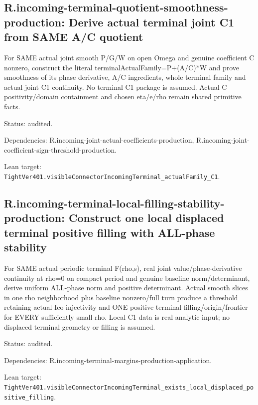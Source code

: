 \documentclass{article}
\begin{document}
\subsection*{R.incoming-terminal-quotient-smoothness-production: Derive actual terminal joint C1 from SAME A/C quotient}
For SAME actual joint smooth P/G/W on open Omega and genuine coefficient C nonzero, construct the literal terminalActualFamily=P+(A/C)*W and prove smoothness of its phase derivative, A/C ingredients, whole terminal family and actual joint C1 continuity. No terminal C1 package is assumed. Actual C positivity/domain containment and chosen eta/e/rho remain shared primitive facts.
\par Status: audited.
\par Dependencies: R.incoming-joint-actual-coefficients-production, R.incoming-joint-coefficient-sign-threshold-production.
\par Lean target: \texttt{TightVer401.visibleConnectorIncomingTerminal\_actualFamily\_C1}.
\subsection*{R.incoming-terminal-local-filling-stability-production: Construct one local displaced terminal positive filling with ALL-phase stability}
For SAME actual periodic terminal F(rho,s), real joint value/phase-derivative continuity at rho=0 on compact period and genuine baseline norm/determinant, derive uniform ALL-phase norm and positive determinant. Actual smooth slices in one rho neighborhood plus baseline nonzero/full turn produce a threshold retaining actual Ico injectivity and ONE positive terminal filling/origin/frontier for EVERY sufficiently small rho. Local C1 data is real analytic input; no displaced terminal geometry or filling is assumed.
\par Status: audited.
\par Dependencies: R.incoming-terminal-margins-production-application.
\par Lean target: \texttt{TightVer401.visibleConnectorIncomingTerminal\_exists\_local\_displaced\_positive\_filling}.
\end{document}
